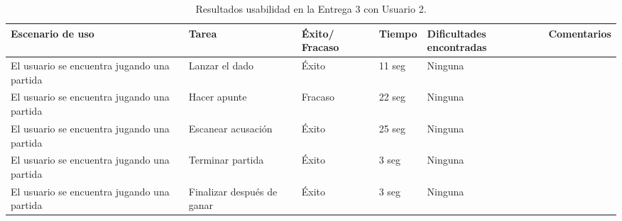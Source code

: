 \begin{table}[h]
  \begin{center}
    \begin{tabular}{|p{2.5cm}|p{1.75cm}|p{1.25cm}|p{1.25cm}|p{2.75cm}|p{3.5cm}|}

      \hline
        \rowcolor{Gray} \textbf{Escenario de uso}
        & \textbf{Tarea}
        & \textbf{Éxito/ Fracaso}
        & \textbf{Tiempo}
        & \textbf{Dificultades encontradas}
        & \textbf{Comentarios}\\

      \hline
      El usuario se encuentra jugando una partida
      & Lanzar el dado
      & Éxito
      & 11 seg
      & Ninguna
      & \\

      \hline
      El usuario se encuentra jugando una partida
      & Hacer apunte
      & Fracaso
      & 22 seg
      & Ninguna
      &\\

      \hline
      El usuario se encuentra jugando una partida
      & Escanear acusación
      & Éxito
      & 25 seg
      & Ninguna
      &\\

      \hline
      El usuario se encuentra jugando una partida
      & Terminar partida
      & Éxito
      & 3 seg
      & Ninguna
      &\\

      \hline
      El usuario se encuentra jugando una partida
      & Finalizar después de ganar
      & Éxito
      & 3 seg
      & Ninguna
      &\\

      \hline

    \end{tabular}

    \caption{Resultados usabilidad en la Entrega 3 con Usuario 2.}
    \label{tabla-entrega-3-usuario2}

  \end{center}
\end{table}


